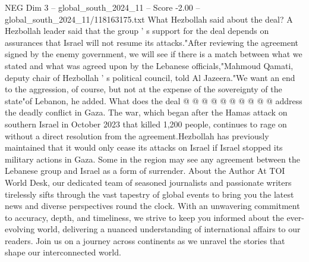 \begin{textsample}{NEG Dim 3 – global\_south\_2024\_11 – Score -2.00 – global\_south\_2024\_11/118163175.txt}
What Hezbollah said about the deal?
A Hezbollah leader said that the group ' s support for the deal depends on assurances that Israel will not resume its attacks."After reviewing the agreement signed by the enemy government, we will see if there is a match between what we stated and what was agreed upon by the Lebanese officials,"Mahmoud Qamati, deputy chair of Hezbollah ' s political council, told Al Jazeera."We want an end to the aggression, of course, but not at the expense of the sovereignty of the state"of Lebanon, he added.
What does the deal @ @ @ @ @ @ @ @ @ @ address the deadly conflict in Gaza.
The war, which began after the Hamas attack on southern Israel in October 2023 that killed 1,200 people, continues to rage on without a direct resolution from the agreement.Hezbollah has previously maintained that it would only cease its attacks on Israel if Israel stopped its military actions in Gaza.
Some in the region may see any agreement between the Lebanese group and Israel as a form of surrender.
About the Author At TOI World Desk, our dedicated team of seasoned journalists and passionate writers tirelessly sifts through the vast tapestry of global events to bring you the latest news and diverse perspectives round the clock.
With an unwavering commitment to accuracy, depth, and timeliness, we strive to keep you informed about the ever-evolving world, delivering a nuanced understanding of international affairs to our readers.
Join us on a journey across continents as we unravel the stories that shape our interconnected world.

\end{textsample}
